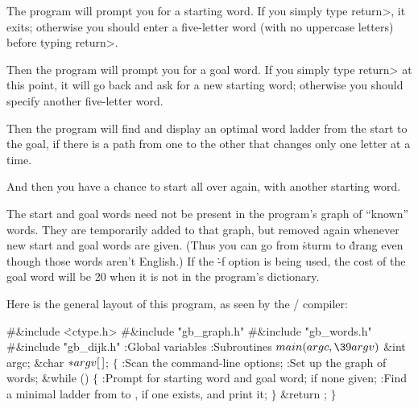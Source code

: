 \fi

The program will prompt you for a starting word. If you simply type
\<return>, it exits; otherwise you should enter a five-letter word
(with no uppercase letters) before typing \<return>.

Then the program will prompt you for a goal word. If you simply type
\<return> at this point, it will go back and ask for a new starting word;
otherwise you should specify another five-letter word.

Then the program will find and display an optimal word ladder from the start
to the goal, if there is a path from one to the other
that changes only one letter at a time.

And then you have a chance to start all over again, with another starting word.

The start and goal words need not be present in the program's graph of
``known'' words. They are temporarily added to that graph, but removed
again whenever new start and goal words are given. (Thus you can go
from \.{sturm} to \.{drang} even though those words aren't English.)
If the \.{-f} option is being used, the cost of the goal word will be 20
when it is not in the program's dictionary.

\fi

Here is the general layout of this program, as seen by the \CEE/ compiler:

\Y\B\8\#\&{include} \.{<ctype.h>}\6
\8\#\&{include} \.{"gb\_graph.h"}\6
\8\#\&{include} \.{"gb\_words.h"}\6
\8\#\&{include} \.{"gb\_dijk.h"}\6
\ATH\7
:Global variables\X\6
:Subroutines\X\7
\1\1${}\\{main}(\\{argc},\39\\{argv}){}$\6
\&{int} \\{argc};\6
\&{char} ${}{*}\\{argv}[\,]{}$;\2\2\6
${}\{{}$\1\6
:Scan the command-line options\X;\6
:Set up the graph of words\X;\6
\&{while} ()\5
${}\{{}$\1\6
:Prompt for starting word and goal word;  if none given\X;\6
:Find a minimal ladder from  to , if one exists,
and print it\X;\6
\4${}\}{}$\2\6
\&{return} ;\6
\4${}\}{}$\2\par
\fi

